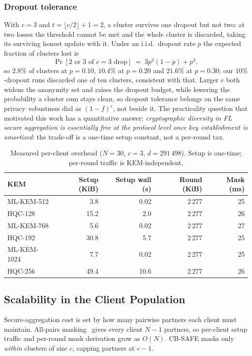 \documentclass[lettersize,journal]{IEEEtran}
\begin{document}
\subsubsection{Dropout tolerance} With $c{=}3$ and
$t{=}\lfloor c/2 \rfloor{+}1{=}2$, a cluster survives one dropout but not two: at two
losses the threshold cannot be met and the whole cluster is discarded, taking its
surviving honest update with it. Under an i.i.d.\ dropout rate $p$ the expected
fraction of clusters lost is
\begin{equation}\label{eq:dropout}
\Pr[\text{2 or 3 of } c{=}3 \text{ drop}] \;=\; 3p^{2}(1-p) + p^{3},
\end{equation}
so $2.8\%$ of
clusters at $p{=}0.10$, $10.4\%$ at $p{=}0.20$ and $21.6\%$ at $p{=}0.30$; our
$10\%$-dropout runs discarded one of ten clusters, consistent with that. Larger $c$
both widens the anonymity set and raises the dropout budget, while lowering the
probability a cluster sum stays clean, so dropout tolerance belongs on the same
privacy--robustness dial as $(1-f)^c$, not beside it. The practicality question that
motivated this work has a quantitative answer: \emph{cryptographic diversity in FL
secure aggregation is essentially free at the protocol level once key establishment
is amortized}: the trade-off is a one-time setup constant, not a per-round tax.

\begin{table}[t]
\caption{Measured per-client overhead ($N{=}30$, $c{=}3$, $d{=}291\,498$).
Setup is one-time; per-round traffic is KEM-independent.}
\label{tab:overhead}
\centering
\footnotesize
\setlength{\tabcolsep}{3.5pt}
\begin{tabular}{@{}lrrrr@{}}
\toprule
KEM & Setup (KiB) & Setup wall (s) & Round (KiB) & Mask (ms) \\
\midrule
ML-KEM-512  & 3.8  & 0.02 & 2\,277 & 25 \\
HQC-128     & 15.2 & 2.0  & 2\,277 & 26 \\
ML-KEM-768  & 5.6  & 0.02 & 2\,277 & 27 \\
HQC-192     & 30.8 & 5.7  & 2\,277 & 25 \\
ML-KEM-1024 & 7.7  & 0.02 & 2\,277 & 25 \\
HQC-256     & 49.4 & 10.6 & 2\,277 & 26 \\
\bottomrule
\end{tabular}
\end{table}

\subsection{Scalability in the Client Population}
Secure-aggregation cost is set by how many pairwise partners each client must
maintain. All-pairs masking~\cite{bonawitz2017} gives every client $N-1$ partners,
so per-client setup traffic and per-round mask derivation grow as $O(N)$. CB-SAFE
masks only \emph{within} clusters of size $c$, capping partners at $c-1$.
\end{document}
